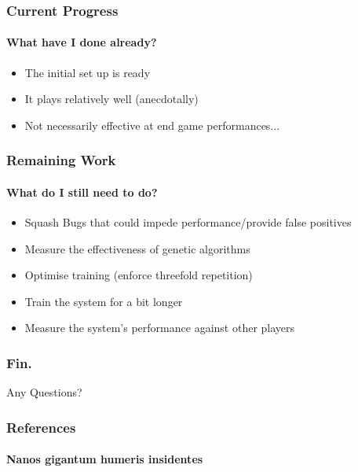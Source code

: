 \documentclass[aspectratio=169]{beamer}
\begin{document}
\begin{frame}
	\frametitle{Current Progress}
	\framesubtitle{What have I done already?}

	\begin{itemize}
		\item The initial set up is ready
		\item It plays relatively well (anecdotally)
		\item Not necessarily effective at end game performances...
	\end{itemize}
\end{frame}

\begin{frame}
	\frametitle{Remaining Work}
	\framesubtitle{What do I still need to do?}
	\begin{itemize}
		\item Squash Bugs that could impede performance/provide false positives
		\item Measure the effectiveness of genetic algorithms
		\item Optimise training (enforce threefold repetition)
		\item Train the system for a bit longer
		\item Measure the system's performance against other players
	\end{itemize}
\end{frame}

\begin{frame}
	\frametitle{Fin.}
	Any Questions?
\end{frame}

\begin{frame}
	\frametitle{References}
	\framesubtitle{Nanos gigantum humeris insidentes}
	
	

\end{frame}
\end{document}
